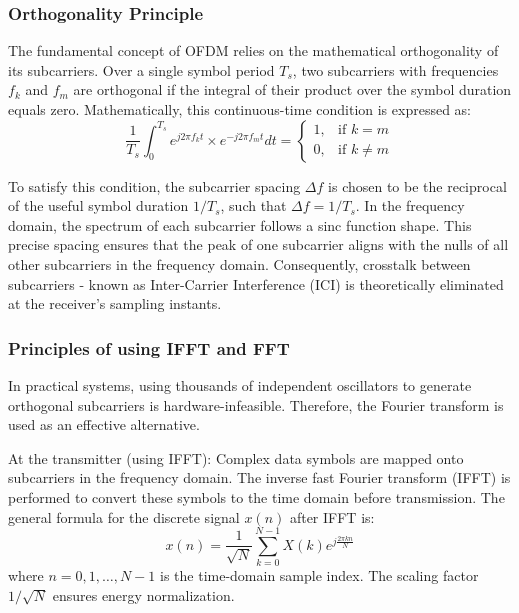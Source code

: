 \documentclass[a4paper]{article}
\begin{document}
\subsubsection{Orthogonality Principle}
The fundamental concept of OFDM relies on the mathematical orthogonality of its subcarriers. Over a single symbol period $T_s$, two subcarriers with frequencies $f_k$ and $f_m$ are orthogonal if the integral of their product over the symbol duration equals zero. Mathematically, this continuous-time condition is expressed as:
\begin{equation}
\frac{1}{T_s} \int_{0}^{T_s} e^{j2\pi f_k t} \times e^{-j2\pi f_m t} dt = 
\begin{cases} 
1, & \text{if } k = m \\ 
0, & \text{if } k \neq m 
\end{cases}
\end{equation}

To satisfy this condition, the subcarrier spacing $\Delta f$ is chosen to be the reciprocal of the useful symbol duration $1/T_s$, such that $\Delta f = 1/T_s$. In the frequency domain, the spectrum of each subcarrier follows a sinc function shape. This precise spacing ensures that the peak of one subcarrier aligns with the nulls of all other subcarriers in the frequency domain. Consequently, crosstalk between subcarriers - known as Inter-Carrier Interference (ICI) is theoretically eliminated at the receiver's sampling instants.

\subsubsection{Principles of using IFFT and FFT}
In practical systems, using thousands of independent oscillators to generate orthogonal subcarriers is hardware-infeasible. Therefore, the Fourier transform is used as an effective alternative.

At the transmitter (using IFFT): Complex data symbols are mapped onto subcarriers in the frequency domain. The inverse fast Fourier transform (IFFT) is performed to convert these symbols to the time domain before transmission. The general formula for the discrete signal $x(n)$ after IFFT is:
\begin{equation}
x(n) = \frac{1}{\sqrt{N}} \sum_{k=0}^{N-1} X(k) e^{j\frac{2\pi kn}{N}}
\end{equation}
where $n=0, 1, \dots, N-1$ is the time-domain sample index. The scaling factor $1/\sqrt{N}$ ensures energy normalization. 
\end{document}
